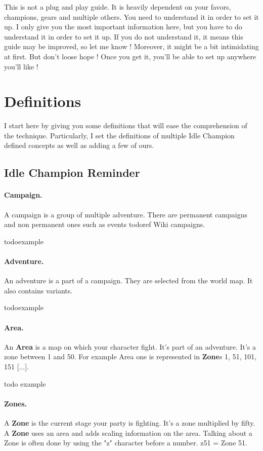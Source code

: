 \documentclass{article}
\begin{document}
This is not a plug and play guide.
It is heavily dependent on your favors, champions, gears and multiple others.
You need to understand it in order to set it up.
I only give you the most important information here, but you have to do understand it in order to set it up.
If you do not understand it, it means this guide may be improved, so let me know !
Moreover, it might be a bit intimidating at first.
But don't loose hope !
Once you get it, you'll be able to set up anywhere you'll like !


\section{Definitions}

I start here by giving you some definitions that will ease the comprehension of the technique.
Particularly, I set the definitions of multiple Idle Champion defined concepts as well as adding a few of ours.

\subsection{Idle Champion Reminder}

\paragraph{Campaign.}
A campaign is a group of multiple adventure.
There are permanent campaigns and non permanent ones such as events todoref Wiki campaigns.

todoexample

\paragraph{Adventure.}

An adventure is a part of a campaign.
They are selected from the world map.
It also contains variants.

todoexample

\paragraph{Area.}

An \textbf{Area} is a map on which your character fight.
It's part of an adventure.
It's a zone between 1 and 50.
For example Area one is represented in \textbf{Zone}s 1, 51, 101, 151 [...].

todo example
\paragraph{Zones.}
A \textbf{Zone} is the current stage your party is fighting.
It's a zone multiplied by fifty.
A \textbf{Zone} uses an area and adds scaling information on the area.
Talking about a Zone is often done by using the "z" character before a number.
z51 = Zone 51.
\end{document}
